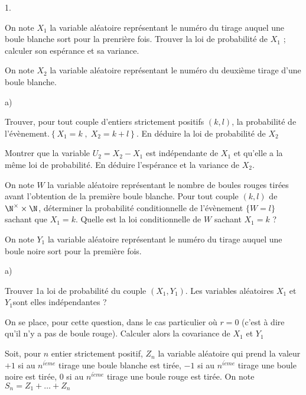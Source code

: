 \documentclass[11pt]{article}%
\begin{document}
\begin{noliste}{1.}
 \setlength{\itemsep}{4mm}
\item On note $X_{1}$ la variable aléatoire représentant le numéro du
tirage
auquel une boule blanche sort pour la prenrière fois. Trouver la loi de
probabilité de $X_{1}$ ; calculer son espérance et sa variance.

\item On note $X_{2}$ la variable aléatoire représentant le numéro du
deuxième tirage d'une boule blanche.

\begin{noliste}{a)}
 \setlength{\itemsep}{2mm}
\item Trouver, pour tout couple d'entiers strictement positifs $\left(
k,l\right) $, la probabilité de l'évènement.$\left\{
X_{1} = k\;,\;X_{2} = k + l\right\} $. En déduire la loi de probabilité
de $X_{2}$

\item Montrer que la variable $U_{2} = X_{2}-X_{1}$ est indépendante de
$X_{1}$
et qu'elle a la même loi de probabilité. En déduire l'espérance et la
variance de $X_{2}$.
\end{noliste}

\item On note $W$ la variable aléatoire représentant le nombre de
boules
rouges tirées avant l'obtention de la première boule blanche. Pour tout
couple $(k,l)$ de $\N^{\times }\times \N$, déterminer la
probabilité conditionnelle de l'évènement $\{W = l\}$ sachant que
$X_{1} = k$.
Quelle est la loi conditionnelle de $W$ sachant $X_{1} = k$ ?

\item On note $Y_{1}$ la variable aléatoire représentant le numéro du
tirage
auquel une boule noire sort pour la première fois.

\begin{noliste}{a)}
 \setlength{\itemsep}{2mm}
\item Trouver 1a loi de probabilité du couple $\left(
X_{1},Y_{1}\right) $.
Les variables aléatoires $X_{1}$ et $Y_{1}$sont elles indépendantes ?

\item On se place, pour cette question, dans le cas particulier où $r =
0$
(c'est à dire qu'il n'y a pas de boule rouge). Calculer alors la
covariance
de $X_{1}$ et $Y_{1}$
\end{noliste}

\item Soit, pour $n$ entier strictement positif, $Z_{n}$ la variable
aléatoire qui prend la valeur $ + 1$ si au $n^{i\grave{e}me}$ tirage
une boule
blanche est tirée, $-1$ si au $n^{i\grave{e}me}$ tirage une boule noire
est
tirée, 0 si au $n^{i\grave{e}me}$ tirage une boule rouge est tirée. On
note $S_{n} = Z_{1} + \dots + Z_{n}$


\end{noliste}
\end{document}

